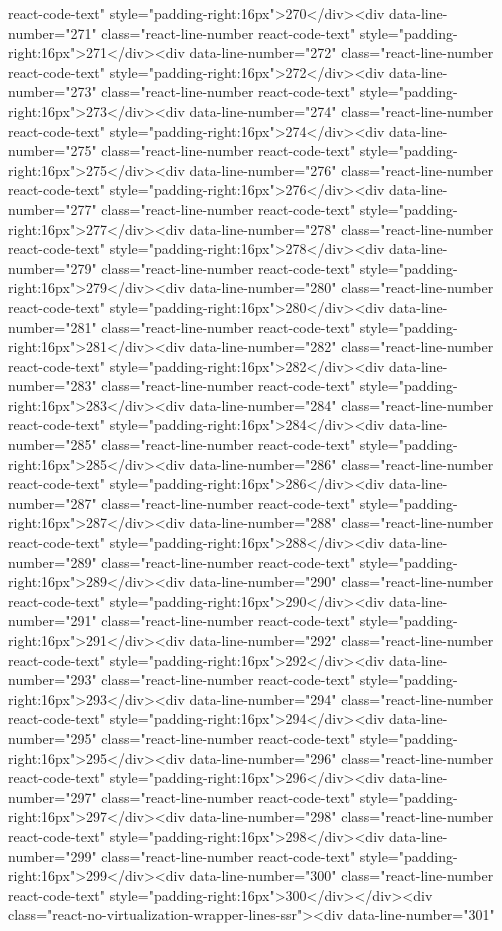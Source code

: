 {{{{{react-code-text" style="padding-right:16px">270</div><div data-line-number="271" class="react-line-number react-code-text" style="padding-right:16px">271</div><div data-line-number="272" class="react-line-number react-code-text" style="padding-right:16px">272</div><div data-line-number="273" class="react-line-number react-code-text" style="padding-right:16px">273</div><div data-line-number="274" class="react-line-number react-code-text" style="padding-right:16px">274</div><div data-line-number="275" class="react-line-number react-code-text" style="padding-right:16px">275</div><div data-line-number="276" class="react-line-number react-code-text" style="padding-right:16px">276</div><div data-line-number="277" class="react-line-number react-code-text" style="padding-right:16px">277</div><div data-line-number="278" class="react-line-number react-code-text" style="padding-right:16px">278</div><div data-line-number="279" class="react-line-number react-code-text" style="padding-right:16px">279</div><div data-line-number="280" class="react-line-number react-code-text" style="padding-right:16px">280</div><div data-line-number="281" class="react-line-number react-code-text" style="padding-right:16px">281</div><div data-line-number="282" class="react-line-number react-code-text" style="padding-right:16px">282</div><div data-line-number="283" class="react-line-number react-code-text" style="padding-right:16px">283</div><div data-line-number="284" class="react-line-number react-code-text" style="padding-right:16px">284</div><div data-line-number="285" class="react-line-number react-code-text" style="padding-right:16px">285</div><div data-line-number="286" class="react-line-number react-code-text" style="padding-right:16px">286</div><div data-line-number="287" class="react-line-number react-code-text" style="padding-right:16px">287</div><div data-line-number="288" class="react-line-number react-code-text" style="padding-right:16px">288</div><div data-line-number="289" class="react-line-number react-code-text" style="padding-right:16px">289</div><div data-line-number="290" class="react-line-number react-code-text" style="padding-right:16px">290</div><div data-line-number="291" class="react-line-number react-code-text" style="padding-right:16px">291</div><div data-line-number="292" class="react-line-number react-code-text" style="padding-right:16px">292</div><div data-line-number="293" class="react-line-number react-code-text" style="padding-right:16px">293</div><div data-line-number="294" class="react-line-number react-code-text" style="padding-right:16px">294</div><div data-line-number="295" class="react-line-number react-code-text" style="padding-right:16px">295</div><div data-line-number="296" class="react-line-number react-code-text" style="padding-right:16px">296</div><div data-line-number="297" class="react-line-number react-code-text" style="padding-right:16px">297</div><div data-line-number="298" class="react-line-number react-code-text" style="padding-right:16px">298</div><div data-line-number="299" class="react-line-number react-code-text" style="padding-right:16px">299</div><div data-line-number="300" class="react-line-number react-code-text" style="padding-right:16px">300</div></div><div class="react-no-virtualization-wrapper-lines-ssr"><div data-line-number="301" }}}}}
